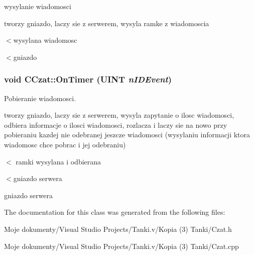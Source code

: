 wysylanie wiadomosci 

tworzy gniazdo, laczy sie z serwerem, wysyla ramke z wiadomoscia 

$<$wysylana wiadomosc

$<$gniazdo 
\subsubsection{\setlength{\rightskip}{0pt plus 5cm}void CCzat::OnTimer (UINT {\em nIDEvent})}\label{class_c_czat_e48522d027efce15cc5eb863319463a9}


Pobieranie wiadomosci. 

tworzy gniazdo, laczy sie z serwerem, wysyla zapytanie o ilosc wiadomosci, odbiera informacje o ilosci wiadomosci, rozlacza i laczy sie na nowo przy pobieraniu kazdej nie odebranej jeszcze wiadomosci (wysylaniu informacji ktora wiadomosc chce pobrac i jej odebraniu) 

$<$ ramki wysylana i odbierana

$<$gniazdo serwera

gniazdo serwera 

The documentation for this class was generated from the following files:\begin{CompactItemize}
\item 
Moje dokumenty/Visual Studio Projects/Tanki.v/Kopia (3) Tanki/Czat.h\item 
Moje dokumenty/Visual Studio Projects/Tanki.v/Kopia (3) Tanki/Czat.cpp\end{CompactItemize}
